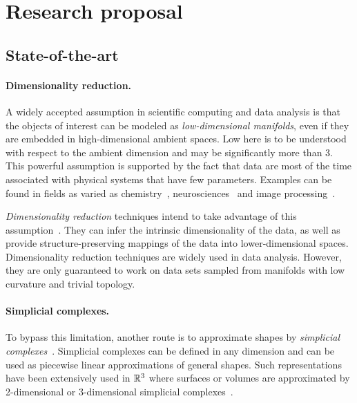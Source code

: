 \section{Research proposal}

\subsection{State-of-the-art}

\paragraph{Dimensionality reduction.} A widely accepted assumption in scientific computing and data analysis is that the objects of interest can be modeled as {\em low-dimensional manifolds}, even if they are embedded in high-dimensional ambient spaces. Low here is to be understood with respect to the ambient dimension and may be significantly more than 3. This powerful assumption is supported by the fact that data are most of the time associated with physical systems that have few parameters.  Examples can be found in fields as varied as chemistry~\cite{mtcw-tco-2010}, neurosciences~\cite{} and  image processing~\cite{cids-lbsni-2008}.

 {\em Dimensionality reduction} techniques intend to take advantage of this assumption~\cite{lv-nldr-2007}.
They can infer the intrinsic dimensionality of the data, as well as provide structure-preserving mappings of the data  into lower-dimensional spaces. Dimensionality reduction techniques are widely used in data analysis. However, they are only guaranteed to work  on data sets sampled from manifolds with low curvature and trivial topology.

\paragraph{Simplicial complexes.} To bypass this limitation, another route is to approximate shapes by {\em simplicial complexes}~\cite{hh-ct-2010}. Simplicial complexes can be defined in any dimension and can be used as piecewise linear approximations of general shapes.
Such representations have been extensively used in $\mathbb R ^3$ where surfaces or volumes are approximated by 2-dimensional or 3-dimensional simplicial complexes~\cite{geometrica-ecg-book}. 

